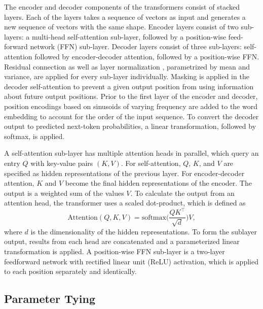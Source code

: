 \documentclass[journal=jacsat,manuscript=article]{achemso}
\begin{document}
	The encoder and decoder components of the transformers consist of stacked layers. Each of the layers takes a sequence of vectors as input and generates a new sequence of vectors with the same shape. Encoder layers consist of two sub-layers: a multi-head self-attention sub-layer, followed by a position-wise feed-forward network (FFN) sub-layer. Decoder layers consist of three sub-layers: self-attention followed by encoder-decoder attention, followed by a position-wise FFN. Residual connection \cite{he2016deep} as well as layer normalization \cite{ba2016layer}, parametrized by mean and variance, are applied for every sub-layer individually. Masking is applied in the decoder self-attention to prevent a given output position from using information about future output positions. Prior to the first layer of the encoder and decoder, position encodings based on sinusoids of varying frequency are added to the word embedding to account for the order of the input sequence. To convert the decoder output to predicted next-token probabilities, a linear transformation, followed by softmax, is applied.
	
	A self-attention sub-layer has multiple attention heads in parallel, which query an entry $Q$ with key-value pairs $(K, V)$. For self-attention, $Q$, $K$, and $V$ are specified as hidden representations of the previous layer. For encoder-decoder attention, $K$ and $V$ become the final hidden representations of the encoder. The output is a weighted sum of the values $V$. To calculate the output from an attention head, the transformer uses a scaled dot-product, which is defined as 
	\begin{equation}
	\text{Attention}(Q, K, V) = \text{softmax}\big(\frac{QK^\top}{\sqrt{d}}\big) V,
	\end{equation}
	where $d$ is the dimensionality of the hidden representations. To form the sublayer output, results from each head are concatenated and a parameterized linear transformation is applied. A position-wise FFN sub-layer is a two-layer feedforward network with rectified linear unit (ReLU) activation, which is applied to each position separately and identically.
	
	
	\subsection{Parameter Tying}
	
\end{document}
